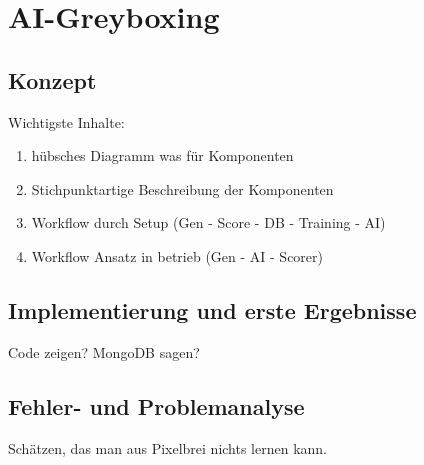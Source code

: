 \chapter{AI-Greyboxing}
\label{Cha:GreyBoxing}
\section{Konzept}
Wichtigste Inhalte:

\begin{enumerate}
	\item hübsches Diagramm was für Komponenten
	\item Stichpunktartige Beschreibung der Komponenten
	\item Workflow durch Setup (Gen - Score - DB - Training - AI)
	\item Workflow Ansatz in betrieb (Gen - AI - Scorer)
\end{enumerate} 

\section{Implementierung und erste Ergebnisse}
Code zeigen? MongoDB sagen? 
\section{Fehler- und Problemanalyse}
Schätzen, das man aus Pixelbrei nichts lernen kann. 
